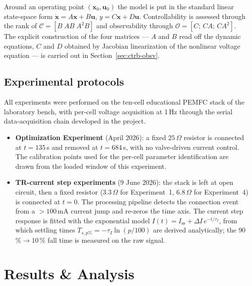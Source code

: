 \documentclass[11pt,a4paper]{article}
\begin{document}
Around an operating point $(\mathbf{x}_0,\mathbf{u}_0)$ the model is put in the
standard linear state-space form
$\dot{\mathbf{x}}=A\mathbf{x}+B\mathbf{u}$, $y=C\mathbf{x}+D\mathbf{u}$.
Controllability is assessed through the rank of
$\mathcal{C}=[B\;AB\;A^2B]$ and observability through
$\mathcal{O}=[C;\,CA;\,CA^2]$. The explicit construction of the four matrices ---
$A$ and $B$ read off the dynamic equations, $C$ and $D$ obtained by Jacobian
linearization of the nonlinear voltage equation --- is carried out in
Section~\ref{sec:ctrb-obsv}.

\subsection{Experimental protocols}
\label{sec:protocols}

All experiments were performed on the ten-cell educational PEMFC stack of the
laboratory bench, with per-cell voltage acquisition at 1\,Hz through the serial
data-acquisition chain developed in the project.
\begin{itemize}[itemsep=1pt]
    \item \textbf{Optimization Experiment} (April 2026): a fixed $25\,\Omega$
          resistor is connected at $t=135$\,s and removed at $t=684$\,s, with no
          valve-driven current control. The calibration points used for the
          per-cell parameter identification are drawn from the loaded window of
          this experiment.
    \item \textbf{TR-current step experiments} (9 June 2026): the stack is left at
          open circuit, then a fixed resistor ($3.3\,\Omega$ for Experiment~1,
          $6.8\,\Omega$ for Experiment~4) is connected at $t=0$. The processing
          pipeline detects the connection event from a $>100$\,mA current jump and
          re-zeros the time axis. The current step response is fitted with the
          exponential model
          $I(t)=I_{\text{ss}}+\Delta I\,e^{-t/\tau_I}$, from which settling times
          $T_{s,p\%}=-\tau_I\ln(p/100)$ are derived analytically; the
          90\,\%$\to$10\,\% fall time is measured on the raw signal.
\end{itemize}

\section{Results \& Analysis}
\label{sec:results}
\end{document}
